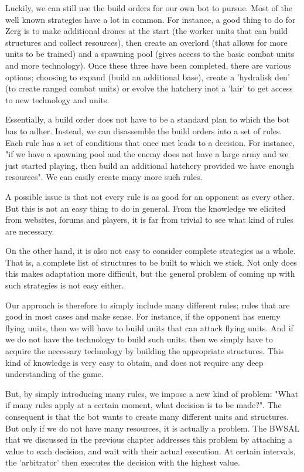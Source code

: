 Luckily, we can still use the build orders for our own bot to pursue. Most of the well known strategies have a lot in common. For instance, a good thing to do for Zerg is to make additional drones at the start (the worker units that can build structures and collect resources), then create an overlord (that allows for more units to be trained) and a spawning pool (gives access to the basic combat units and more technology). Once these three have been completed, there are various options; choosing to expand (build an additional base), create a 'hydralisk den' (to create ranged combat units) or evolve the hatchery inot a 'lair' to get access to new technology and units.

Essentially, a build order does not have to be a standard plan to which the bot has to adher. Instead, we can disassemble the build orders into a set of rules. Each rule has a set of conditions that once met leads to a decision. For instance, "if we have a spawning pool and the enemy does not have a large army and we just started playing, then build an additional hatchery provided we have enough resources".  We can easily create many more such rules.

A possible issue is that not every rule is as good for an opponent as every other. But this is not an easy thing to do in general. From the knowledge we elicited from websites, forums and players, it is far from trivial to see what kind of rules are necessary.

On the other hand, it is also not easy to consider complete strategies as a whole. That is, a complete list of structures to be built to which we stick. Not only does this makes adaptation more difficult, but the general problem of coming up with such strategies is not easy either.

Our approach is therefore to simply include many different rules; rules that are good in most cases and make sense. For instance, if the opponent has enemy flying units, then we will have to build units that can attack flying units. And if we do not have the technology to build such units, then we simply have to acquire the necessary technology by building the appropriate structures. This kind of knowledge is very easy to obtain, and does not require any deep understanding of the game.

But, by simply introducing many rules, we impose a new kind of problem: "What if many rules apply at a certain moment, what decision is to be made?". The consequent is that the bot wants to create many different units and structures. But only if we do not have many resources, it is actually a problem. The BWSAL that we discussed in the previous chapter addresses this problem by attaching a value to each decision, and wait with their actual execution. At certain intervals, the 'arbitrator' then executes the decision with the highest value.

